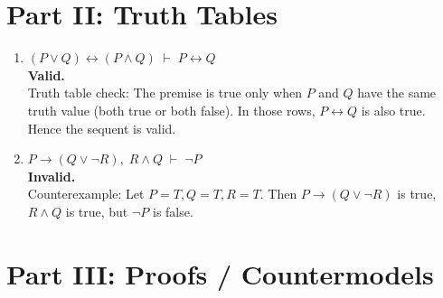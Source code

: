\documentclass[12pt]{article}
\begin{document}
\clearpage
\section*{Part II: Truth Tables}

\begin{enumerate}[label=\arabic*.]

\item $(P \lor Q) \leftrightarrow (P \land Q) \;\vdash\; P \leftrightarrow Q$\\
\textbf{Valid.}\\
Truth table check: The premise is true only when $P$ and $Q$ have the same truth value (both true or both false). In those rows, $P \leftrightarrow Q$ is also true. Hence the sequent is valid.

\item $P \to (Q \lor \neg R),\; R \land Q \;\vdash\; \neg P$\\
\textbf{Invalid.}\\
Counterexample: Let $P{=}T, Q{=}T, R{=}T$. Then $P \to (Q \lor \neg R)$ is true, $R \land Q$ is true, but $\neg P$ is false.

\end{enumerate}

\section*{Part III: Proofs / Countermodels}
\end{document}
